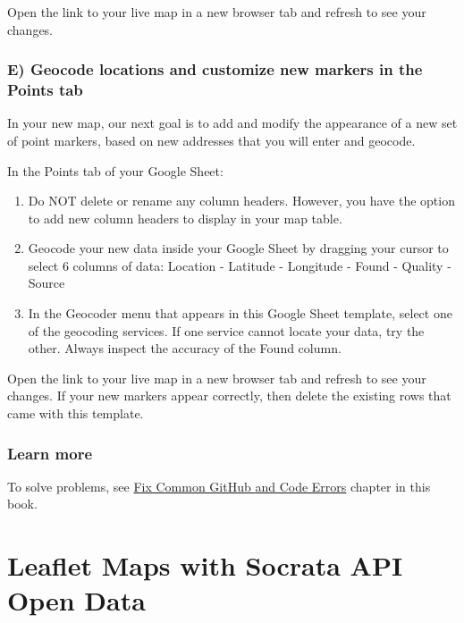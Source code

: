 \documentclass[
  english,
]{book}
\begin{document}
Open the link to your live map in a new browser tab and refresh to see your changes.

\hypertarget{e-geocode-locations-and-customize-new-markers-in-the-points-tab-1}{%
\subsubsection*{E) Geocode locations and customize new markers in the Points tab}\label{e-geocode-locations-and-customize-new-markers-in-the-points-tab-1}}

In your new map, our next goal is to add and modify the appearance of a new set of point markers, based on new addresses that you will enter and geocode.

In the Points tab of your Google Sheet:

\begin{enumerate}
\def\labelenumi{\arabic{enumi})}
\item
  Do NOT delete or rename any column headers. However, you have the option to add new column headers to display in your map table.
\item
  Geocode your new data inside your Google Sheet by dragging your cursor to select 6 columns of data: Location - Latitude - Longitude - Found - Quality - Source
\item
  In the Geocoder menu that appears in this Google Sheet template, select one of the geocoding services. If one service cannot locate your data, try the other. Always inspect the accuracy of the Found column.
\end{enumerate}

Open the link to your live map in a new browser tab and refresh to see your changes. If your new markers appear correctly, then delete the existing rows that came with this template.

\hypertarget{learn-more-22}{%
\subsubsection*{Learn more}\label{learn-more-22}}

To solve problems, see \href{fix-code}{Fix Common GitHub and Code Errors} chapter in this book.

\hypertarget{leaflet-maps-with-socrata}{%
\section{Leaflet Maps with Socrata API Open Data}\label{leaflet-maps-with-socrata}}
\end{document}
